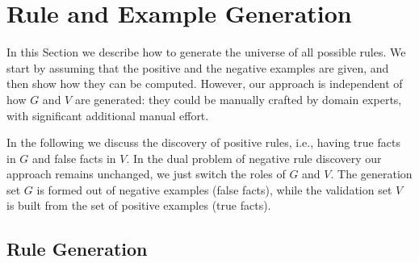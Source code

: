 \section{Rule and Example Generation} \label{sec:rules_gen}
In this Section we describe how to generate the universe of all possible rules. 
We start by assuming that the positive and the negative examples are given, and then show how they can be computed. However, our approach is independent of how $G$ and $V$ are generated: they could be manually crafted by domain experts, with significant additional manual effort.

In the following we discuss the discovery of positive rules, i.e., having true facts in $G$ and false facts in $V$.
In the dual problem of negative rule discovery our approach remains unchanged, we just switch the roles of $G$ and $V$. The generation set $G$ is formed out of negative examples (false facts), while the validation set $V$ is built from the set of positive examples (true facts). 


\vspace{-1ex}	
\subsection{Rule Generation} \label{sec:rules_generation}
\vspace{-1ex}	

